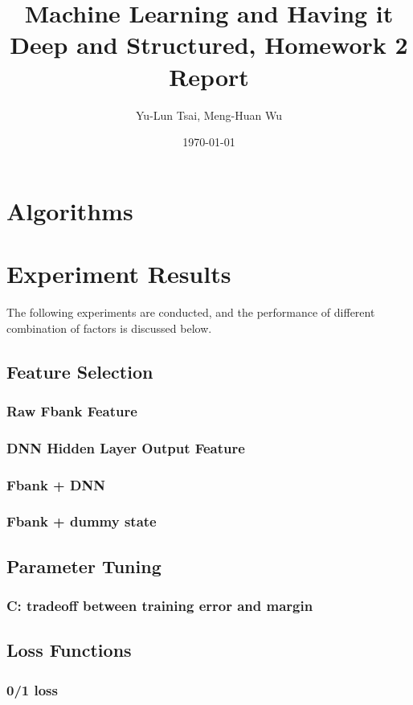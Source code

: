 \documentclass[12pt]{article}%
\begin{document}
\title{Machine Learning and Having it Deep and Structured, Homework 2 Report}
\author{Yu-Lun Tsai, Meng-Huan Wu}
\date{\today}
\maketitle
\section{Algorithms}

\section{Experiment Results}

The following experiments are conducted, and the performance of different combination of factors is discussed below.
\subsection{Feature Selection}
\subsubsection{Raw Fbank Feature}
\subsubsection{DNN Hidden Layer Output Feature}
\subsubsection{Fbank + DNN}
\subsubsection{Fbank + dummy state}
\subsection{Parameter Tuning}
\subsubsection{C: tradeoff between training error and margin}
\subsection{Loss Functions}
\subsubsection{0/1 loss}
\end{document}
